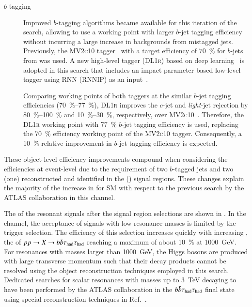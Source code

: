 \begin{description}
\item[$b$-tagging] Improved $b$-tagging algorithms became available
  for this iteration of the search, allowing to use a working point
  with larger $b$-jet tagging efficiency without incurring a large
  increase in backgrounds from mistagged jets. Previously, the
  \textsc{MV2c10} tagger~\cite{ATL-PHYS-PUB-2016-012} with a target
  efficiency of \SI{70}{\percent} for $b$-jets from \ttbar was used. A
  new high-level tagger (\textsc{DL1r}) based on deep
  learning~\cite{ATL-PHYS-PUB-2017-013,guth} is adopted in this search
  that includes an impact parameter based low-level tagger using RNN
  (\textsc{RNNIP}) as an input~\cite{ATL-PHYS-PUB-2017-003}.

  Comparing working points of both taggers at the similar $b$-jet
  tagging efficiencies (\SIrange{70}{77}{\percent}), \textsc{DL1r}
  improves the $c$-jet and \emph{light}-jet rejection by
  \SIrange{80}{100}{\percent} and \SIrange{10}{30}{\percent},
  respectively, over \textsc{MV2c10}~\cite{guth}. Therefore, the
  \textsc{DL1r} working point with \SI{77}{\percent} $b$-jet tagging
  efficiency is used, replacing the \SI{70}{\percent} efficiency
  working point of the \textsc{MV2c10} tagger. Consequently, a
  \SI{10}{\percent} relative improvement in $b$-jet tagging efficiency
  is expected.
\end{description}
These object-level efficiency improvements compound when considering
the efficiencies at event-level due to the requirement of two
$b$-tagged jets and two (one) reconstructed and identified \tauhadvis
in the \hadhad (\lephad) signal regions. These changes explain the
majority of the increase in \AccTimesEff for SM \HH with respect to
the previous search by the ATLAS collaboration in this channel.

The \AccTimesEff of the resonant \HH signals after the signal region
selections are shown in . In the
\hadhad channel, the acceptance of signals with low resonance masses
is limited by the trigger selection. The efficiency of this selection
increases quickly with increasing \mX, the \AccTimesEff of
$pp \to X \to b\bar{b}\tau_{\text{had}}\tau_{\text{had}}$ reaching a maximum of about
\SI{10}{\percent} at \SI{1000}{\GeV}. For resonances with masses
larger than \SI{1000}{\GeV}, the Higgs bosons are produced with large
transverse momentum such that their decay products cannot be resolved
using the object reconstruction techniques employed in this
search. Dedicated searches for scalar resonances with masses up to
\SI{3}{\TeV} decaying to \HH have been performed by the ATLAS
collaboration in the $b\bar{b}\tau_{\text{had}}\tau_{\text{had}}$ final state using special
reconstruction techniques in Ref.~\cite{HDBS-2019-22}.

